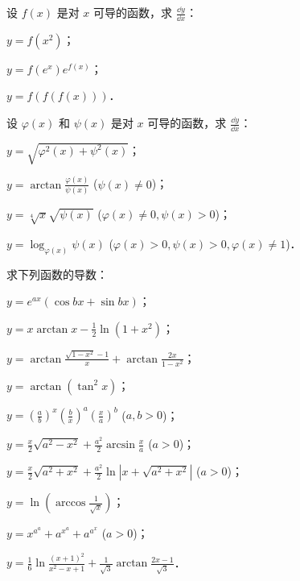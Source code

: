 \begin{xiti}
\item 设 $f(x)$ 是对 $x$ 可导的函数，求 $\frac{\dd y}{\dd x}$：
\begin{ziti}
\item $y = f(x^2)$；
\item $y = f(e^x)e^{f(x)}$；
\item $y = f(f(f(x)))$．
\end{ziti}

\item 设 $\varphi(x)$ 和 $\psi(x)$ 是对 $x$ 可导的函数，求 $\frac{\dd y}{\dd x}$：
\begin{ziti}
\item $y = \sqrt{\varphi^2(x) + \psi^2(x)}$；
\item $y = \arctan\frac{\varphi(x)}{\psi(x)}$ ($\psi(x) \neq 0$)；
\item $y = \sqrt[4]{x}\sqrt{\psi(x)}$ ($\varphi(x) \neq 0, \psi(x) > 0$)；
\item $y = \log_{\varphi(x)}\psi(x)$ ($\varphi(x) > 0, \psi(x) > 0, \varphi(x) \neq 1$)．
\end{ziti}

\item 求下列函数的导数：
\begin{ziti}
\item $y = e^{ax}(\cos bx + \sin bx)$；
\item $y = x\arctan x - \frac{1}{2}\ln(1+x^2)$；
\item $y = \arctan\frac{\sqrt{1-x^2}-1}{x} + \arctan\frac{2x}{1-x^2}$；
\item $y = \arctan(\tan^2 x)$；
\item $y = \left(\frac{a}{b}\right)^x \left(\frac{b}{x}\right)^a \left(\frac{x}{a}\right)^b$ ($a, b > 0$)；
\item $y = \frac{x}{2}\sqrt{a^2-x^2} + \frac{a^2}{2}\arcsin\frac{x}{a}$ ($a > 0$)；
\item $y = \frac{x}{2}\sqrt{a^2+x^2} + \frac{a^2}{2}\ln|x + \sqrt{a^2+x^2}|$ ($a > 0$)；
\item $y = \ln\left(\arccos\frac{1}{\sqrt{x}}\right)$；
\item $y = x^{a^a} + a^{x^a} + a^{a^x}$ ($a > 0$)；
\item $y = \frac{1}{6}\ln\frac{(x+1)^2}{x^2-x+1} + \frac{1}{\sqrt{3}}\arctan\frac{2x-1}{\sqrt{3}}$．
\end{ziti}
\end{xiti}
